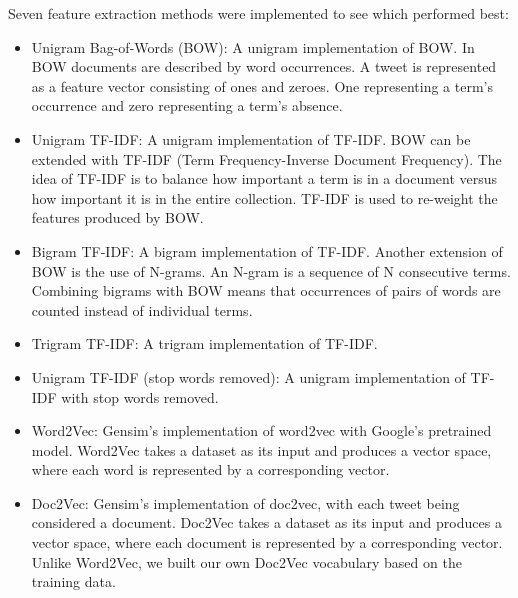 Seven feature extraction methods were implemented to see which performed best:
\begin{itemize}
    \item Unigram Bag-of-Words (BOW): A unigram implementation of BOW. In BOW documents are described by word occurrences. A tweet is represented as a feature vector consisting of ones and zeroes. One representing a term's occurrence and zero representing a term's absence.
    \item Unigram TF-IDF: A unigram implementation of TF-IDF. BOW can be extended with TF-IDF (Term Frequency-Inverse Document Frequency). The idea of TF-IDF is to balance how important a term is in a document versus how important it is in the entire collection. TF-IDF is used to re-weight the features produced by BOW.
    \item Bigram TF-IDF: A bigram implementation of TF-IDF. Another extension of BOW is the use of N-grams. An N-gram is a sequence of N consecutive terms. Combining bigrams with BOW means that occurrences of pairs of words are counted instead of individual terms.
    \item Trigram TF-IDF: A trigram implementation of TF-IDF.
    \item Unigram TF-IDF (stop words removed): A unigram implementation of TF-IDF with stop words removed.
    \item Word2Vec: Gensim's implementation of word2vec with Google's pretrained model. Word2Vec takes a dataset as its input and produces a vector space, where each word is represented by a corresponding vector.
    \item Doc2Vec: Gensim's implementation of doc2vec, with each tweet being considered a document. Doc2Vec takes a dataset as its input and produces a vector space, where each document is represented by a corresponding vector. Unlike Word2Vec, we built our own Doc2Vec vocabulary based on the training data.
\end{itemize}

